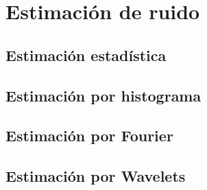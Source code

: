 \section{Estimación de ruido} \label{sec:estimacion}

\subsection{Estimación estadística} \label{subsec:est_stat}

\subsection{Estimación por histograma} \label{subsec:est_hist}

\subsection{Estimación por Fourier} \label{subsec:est_fourier}

\subsection{Estimación por Wavelets} \label{subsec:est_wavelets}